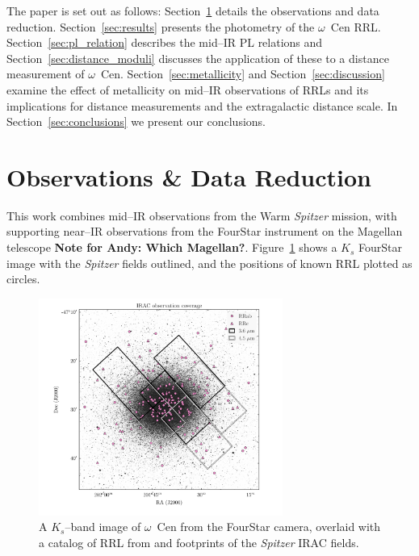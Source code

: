 \documentclass[a4paper,fleqn,usenatbib]{mnras}
\begin{document}
The paper is set out as follows: Section~\ref{sec:observations} details the observations and data reduction. Section~\ref{sec:results} presents the photometry of the $\omega$~Cen RRL. Section~\ref{sec:pl_relation} describes the mid--IR PL relations and Section~\ref{sec:distance_moduli} discusses the application of these to a distance measurement of  $\omega$~Cen. Section~\ref{sec:metallicity} and Section~\ref{sec:discussion} examine the effect of metallicity on mid--IR observations of RRLs and its implications for distance measurements and the extragalactic distance scale. In Section~\ref{sec:conclusions} we present our conclusions.

\section{Observations \& Data Reduction}
\label{sec:observations}
This work combines mid--IR observations from the Warm {\it Spitzer} mission, with supporting near--IR observations from the FourStar instrument on the Magellan telescope \citep{2013PASP..125..654P} {\bf Note for Andy: Which Magellan?}. Figure~\ref{fig:omegaCen_fields} shows a $K_s$ FourStar image with the {\it Spitzer} fields outlined, and the positions of known RRL plotted as circles.

\begin{figure}
\begin{center}
\includegraphics[width=80mm]{reworked_fitting_code/final_plots/omegacen_coverage_map_new.pdf}
\caption{A $K_s$--band image of $\omega$~Cen from the FourStar camera, overlaid with a catalog of RRL from \citet{2004A&A...424.1101K} and footprints of the {\it Spitzer} IRAC fields.}
\label{fig:omegaCen_fields}
\end{center}
\end{figure}
\end{document}
